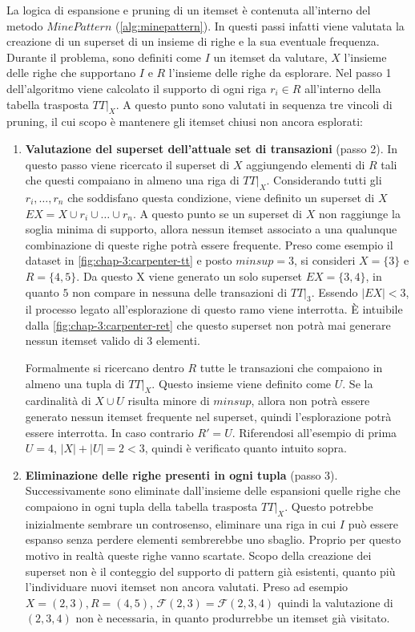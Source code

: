 La logica di espansione e pruning di un itemset è contenuta all'interno del metodo \(MinePattern\) (\cref{alg:minepattern}).
In questi passi infatti viene valutata la creazione di un superset di un insieme di righe e la sua eventuale frequenza.
Durante il problema, sono definiti come \(I\) un itemset da valutare, \(X\) l'insieme delle righe che supportano \(I\) e \(R\) l'insieme delle righe da esplorare. 
Nel passo 1 dell'algoritmo viene calcolato il supporto di ogni riga \(r_i \in R\) all'interno della tabella trasposta \(TT|_X\).
A questo punto sono valutati in sequenza tre vincoli di pruning, il cui scopo è mantenere gli itemset chiusi non ancora esplorati:

\begin{enumerate}
    \item \textbf{Valutazione del superset dell'attuale set di transazioni} (passo 2).
    In questo passo viene ricercato il superset di \(X\) aggiungendo elementi di \(R\) tali che questi compaiano in almeno una riga di \(TT|_X\).
    Considerando tutti gli \(r_i,\ldots,r_n\) che soddisfano questa condizione, viene definito un superset di \(X\) \(EX = X \cup r_i \cup \ldots \cup r_n\).
    A questo punto se un superset di \(X\) non raggiunge la soglia minima di supporto, allora nessun itemset associato a una qualunque combinazione di queste righe potrà essere frequente.
    Preso come esempio il dataset in \cref{fig:chap-3:carpenter-tt} e posto \(minsup = 3\), si consideri \(X = \{3\}\) e \(R = \{4,5\}\).
    Da questo X viene generato un solo superset \(EX = \{3,4\}\), in quanto \(5\) non compare in nessuna delle transazioni di \(TT|_3\).
    Essendo \(|EX| < 3\), il processo legato all'esplorazione di questo ramo viene interrotta.
    È intuibile dalla \cref{fig:chap-3:carpenter-ret} che questo superset non potrà mai generare nessun itemset valido di \(3\) elementi.
    
    Formalmente si ricercano dentro \(R\) tutte le transazioni che compaiono in almeno una tupla di \(TT|_{X}\).
    Questo insieme viene definito come \(U\).
    Se la cardinalità di \(X \cup U\) risulta minore di \(minsup\), allora non potrà essere generato nessun itemset frequente nel superset, quindi l'esplorazione potrà essere interrotta.
    In caso contrario \(R' = U\). 
    Riferendosi all'esempio di prima \(U = {4}\), \(|X| + |U| = 2 < 3\), quindi è verificato quanto intuito sopra.
    
    \item \textbf{Eliminazione delle righe presenti in ogni tupla} (passo 3).
    Successivamente sono eliminate dall'insieme delle espansioni quelle righe che compaiono in ogni tupla della tabella trasposta \(TT|_X\).
    Questo potrebbe inizialmente sembrare un controsenso, eliminare una riga in cui \(I\) può essere espanso senza perdere elementi sembrerebbe uno sbaglio.
    Proprio per questo motivo in realtà queste righe vanno scartate.
    Scopo della creazione dei superset non è il conteggio del supporto di pattern già esistenti, quanto più l'individuare nuovi itemset non ancora valutati.
    Preso ad esempio \(X = (2,3), R = (4,5)\), \(\mathcal{F}(2,3) = \mathcal{F}(2,3,4)\) quindi la valutazione di \((2,3,4)\) non è necessaria, in quanto produrrebbe un itemset già visitato.
    

\end{enumerate}
